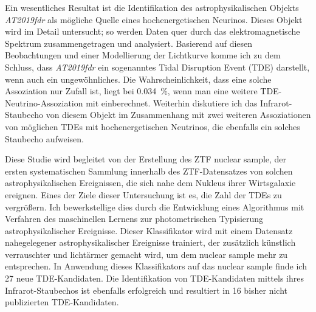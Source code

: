 Ein wesentliches Resultat ist die Identifikation des astrophysikalischen Objekts \textit{AT2019fdr} als mögliche Quelle eines hochenergetischen Neurinos. Dieses Objekt wird im Detail untersucht; so werden Daten quer durch das elektromagnetische Spektrum zusammengetragen und analysiert. Basierend auf diesen Beobachtungen und einer Modellierung der Lichtkurve komme ich zu dem Schluss, dass \textit{AT2019fdr} ein sogenanntes Tidal Disruption Event (TDE) darstellt, wenn auch ein ungewöhnliches. Die Wahrscheinlichkeit, dass eine solche Assoziation nur Zufall ist, liegt bei \SI{0.034}{\percent}, wenn man eine weitere TDE-Neutrino-Assoziation mit einberechnet. Weiterhin diskutiere ich das Infrarot-Staubecho von diesem Objekt im Zusammenhang mit zwei weiteren Assoziationen von möglichen TDEs mit hochenergetischen Neutrinos, die ebenfalls ein solches Staubecho aufweisen.

Diese Studie wird begleitet von der Erstellung des ZTF nuclear sample, der ersten systematischen Sammlung innerhalb des ZTF-Datensatzes von solchen astrophysikalischen Ereignissen, die sich nahe dem Nukleus ihrer Wirtsgalaxie ereignen. Eines der Ziele dieser Untersuchung ist es, die Zahl der TDEs zu vergrößern. Ich bewerkstellige dies durch die Entwicklung eines Algorithmus mit Verfahren des maschinellen Lernens zur photometrischen Typisierung astrophysikalischer Ereignisse. Dieser Klassifikator wird mit einem Datensatz nahegelegener astrophysikalischer Ereignisse trainiert, der zusätzlich künstlich verrauschter und lichtärmer gemacht wird, um dem nuclear sample mehr zu entsprechen. In Anwendung dieses Klassifikators auf das nuclear sample finde ich 27 neue TDE-Kandidaten. Die Identifikation von TDE-Kandidaten mittels ihres Infrarot-Staubechos ist ebenfalls erfolgreich und resultiert in 16 bisher nicht publizierten TDE-Kandidaten.
